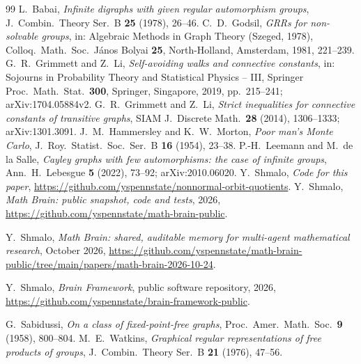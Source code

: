 \documentclass[11pt]{amsart}
\theoremstyle{definition}
\theoremstyle{remark}
\begin{document}
\begin{thebibliography}{99}
 L.~Babai, \emph{Infinite digraphs with given regular automorphism groups}, J.\ Combin.\ Theory Ser.\ B \textbf{25} (1978), 26--46.
 C.~D.~Godsil, \emph{GRRs for non-solvable groups}, in: Algebraic Methods in Graph Theory (Szeged, 1978), Colloq.\ Math.\ Soc.\ J\'anos Bolyai \textbf{25}, North-Holland, Amsterdam, 1981, 221--239.
 G.~R.~Grimmett and Z.~Li, \emph{Self-avoiding walks and connective constants}, in: Sojourns in Probability Theory and Statistical Physics -- III, Springer Proc.\ Math.\ Stat.\ \textbf{300}, Springer, Singapore, 2019, pp.~215--241; arXiv:1704.05884v2.
 G.~R.~Grimmett and Z.~Li, \emph{Strict inequalities for connective constants of transitive graphs}, SIAM J.\ Discrete Math.\ \textbf{28} (2014), 1306--1333; arXiv:1301.3091.
 J.~M.~Hammersley and K.~W.~Morton, \emph{Poor man's Monte Carlo}, J.\ Roy.\ Statist.\ Soc.\ Ser.\ B \textbf{16} (1954), 23--38.
 P.-H.~Leemann and M.~de la Salle, \emph{Cayley graphs with few automorphisms: the case of infinite groups}, Ann.\ H.\ Lebesgue \textbf{5} (2022), 73--92; arXiv:2010.06020.
 Y.~Shmalo, \emph{Code for this paper}, \url{https://github.com/yspennstate/nonnormal-orbit-quotients}.
 Y.~Shmalo, \emph{Math Brain: public snapshot, code and tests}, 2026, \url{https://github.com/yspennstate/math-brain-public}.

 Y.~Shmalo, \emph{Math Brain: shared, auditable memory for multi-agent mathematical research}, October 2026, \url{https://github.com/yspennstate/math-brain-public/tree/main/papers/math-brain-2026-10-24}.

 Y.~Shmalo, \emph{Brain Framework}, public software repository, 2026, \url{https://github.com/yspennstate/brain-framework-public}.

 G.~Sabidussi, \emph{On a class of fixed-point-free graphs}, Proc.\ Amer.\ Math.\ Soc.\ \textbf{9} (1958), 800--804.
 M.~E.~Watkins, \emph{Graphical regular representations of free products of groups}, J.\ Combin.\ Theory Ser.\ B \textbf{21} (1976), 47--56.
\end{thebibliography}
\end{document}
